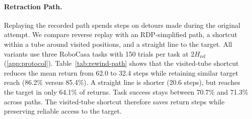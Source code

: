 
\paragraph{Retraction Path.}
Replaying the recorded path spends steps on detours made during the original attempt. We compare reverse replay with an RDP-simplified path, a shortcut within a tube around visited positions, and a straight line to the target. All variants use three RoboCasa tasks with 150 trials per task at $2H_{\mathrm{ref}}$ (\cref{app:protocol}). Table~\ref{tab:rewind-path} shows that the visited-tube shortcut reduces the mean return from 62.0 to 32.4 steps while retaining similar target reach (86.2\% versus 85.4\%). A straight line is shorter (20.6 steps), but reaches the target in only 64.1\% of returns. Task success stays between 70.7\% and 71.3\% across paths. The visited-tube shortcut therefore saves return steps while preserving reliable access to the target.
\finishwrap
